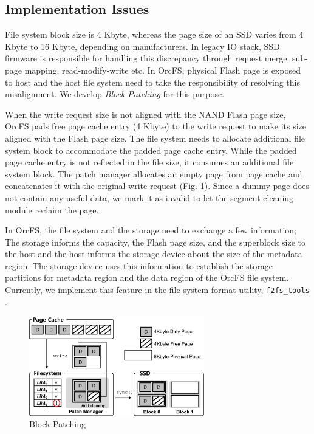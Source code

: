 \documentclass[pageno]{jpaper}
\begin{document}
\subsection{Implementation Issues}
\label{subsec:OrcFS_implementation}



File system block size is 4 Kbyte, whereas the page size of an SSD
varies from 4 Kbyte to 16 Kbyte, depending on manufacturers.  In
legacy IO stack, SSD firmware is responsible for handling this
discrepancy through request merge, sub-page mapping, read-modify-write
\cite{agrawal2008design} etc. In OrcFS, physical Flash page is
exposed to host and the host file system need to take the
responsibility of resolving this misalignment. We develop \emph{Block
  Patching} for this purpose.

When the write request size is not aligned with the NAND Flash page
size, OrcFS pads free page cache entry (4 Kbyte) to the write request
to make its size aligned with the Flash page size. The file system
needs to allocate additional file system block to accommodate the
padded page cache entry. While the padded page cache entry is not
reflected in the file size, it consumes an additional file system
block.  The patch manager allocates an empty page from page cache and
concatenates it with the original write request
(Fig. \ref{fig:patch_manager}).  Since a dummy page does not contain
any useful data, we mark it as invalid to let the segment cleaning
module reclaim the page.

In OrcFS, the file system and the storage need to exchange a few
information; The storage informs the capacity, the Flash page 
size, and the superblock size to the host and the host informs the
storage device about the size of the metadata region. The storage device
uses this information to establish the storage partitions for metadata
region and the data region of the OrcFS file system. Currently, we
implement this feature in the file system format utility,
\texttt{f2fs\_tools} \cite{f2fs_tools}.


\begin{figure}[t]
\begin{center}
\includegraphics[width=3in]{./figure/patch_manager}
\caption{Block Patching}
\label{fig:patch_manager}
\end{center}
\end{figure}
\end{document}
